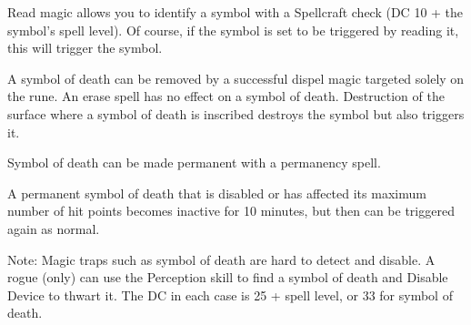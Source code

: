 {Read magic allows you to identify a symbol with a Spellcraft check (DC 10 + the symbol's spell level). Of course, if the symbol is set to be triggered by reading it, this will trigger the symbol.

A symbol of death can be removed by a successful dispel magic targeted solely on the rune. An erase spell has no effect on a symbol of death. Destruction of the surface where a symbol of death is inscribed destroys the symbol but also triggers it.

Symbol of death can be made permanent with a permanency spell.

A permanent symbol of death that is disabled or has affected its maximum number of hit points becomes inactive for 10 minutes, but then can be triggered again as normal.

Note: Magic traps such as symbol of death are hard to detect and disable. A rogue (only) can use the Perception skill to find a symbol of death and Disable Device to thwart it. The DC in each case is 25 + spell level, or 33 for symbol of death.}
        
